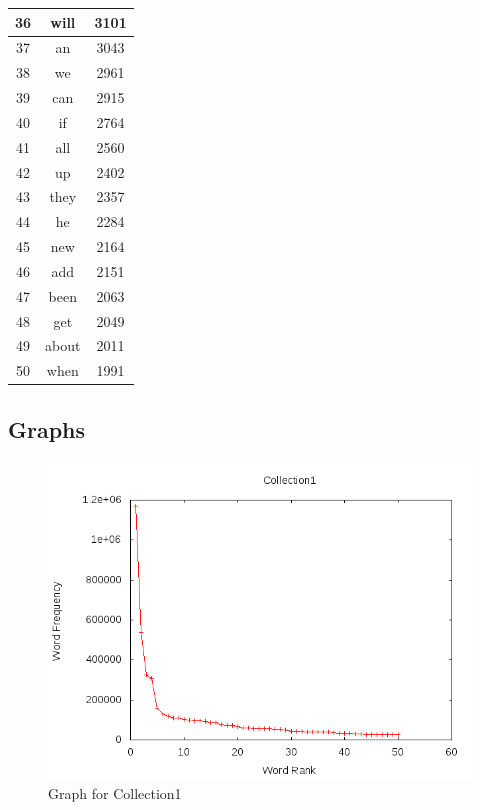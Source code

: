 \begin{enumerate}
\begin{table}
\begin{center}
\begin{tabular}{ c | c | c }
36 & will & 3101 \\ \hline
37 & an & 3043 \\ \hline
38 & we & 2961 \\ \hline
39 & can & 2915 \\ \hline
40 & if & 2764 \\ \hline
41 & all & 2560 \\ \hline
42 & up & 2402 \\ \hline
43 & they & 2357 \\ \hline
44 & he & 2284 \\ \hline
45 & new & 2164 \\ \hline
46 & add & 2151 \\ \hline
47 & been & 2063 \\ \hline
48 & get & 2049 \\ \hline
49 & about & 2011 \\ \hline
50 & when & 1991 \\ \hline
				\end{tabular}
			\end{center}  
	\end{table}  
  
\end{enumerate}



\newpage

\subsection{Graphs}
\begin{figure}[ht]    
    \begin{center}
        \includegraphics[scale=0.60]{plot_graph_c1.png}
        \caption{Graph for Collection1}        
    \end{center}
\end{figure}

